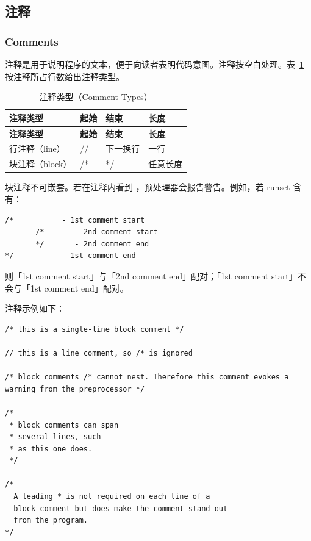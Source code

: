 \subsection{注释}
\subsubsection*{Comments}

注释是用于说明程序的文本，便于向读者表明代码意图。注释按空白处理。表~\ref{tab:pxl-comment-types} 按注释所占行数给出注释类型。

\begin{longtable}{@{}p{} >{\raggedright\arraybackslash\ttfamily}p{} >{\raggedright\arraybackslash\ttfamily}p{} p{}@{}}
\caption{注释类型（Comment Types）}\label{tab:pxl-comment-types}\\
\toprule
\textbf{\textrm{注释类型}} & \textbf{\textrm{起始}} & \textbf{\textrm{结束}} & \textbf{\textrm{长度}} \\
\midrule
\endfirsthead
\toprule
\textbf{\textrm{注释类型}} & \textbf{\textrm{起始}} & \textbf{\textrm{结束}} & \textbf{\textrm{长度}} \\
\midrule
\endhead
\bottomrule
\endfoot
\textrm{行注释（line）} & // & 下一换行 & 一行 \\
\textrm{块注释（block）} & /* & */ & 任意长度 \\
\end{longtable}

块注释不可嵌套。若在注释内看到 \cmd{*/}，预处理器会报告警告。例如，若 runset 含有：
\begin{lstlisting}[style=pxl]
/*           - 1st comment start
       /*       - 2nd comment start
       */       - 2nd comment end
*/           - 1st comment end
\end{lstlisting}

则「1st comment start」与「2nd comment end」配对；「1st comment start」不会与「1st comment end」配对。

注释示例如下：
\begin{lstlisting}[style=pxl]
/* this is a single-line block comment */

// this is a line comment, so /* is ignored

/* block comments /* cannot nest. Therefore this comment evokes a
warning from the preprocessor */

/*
 * block comments can span
 * several lines, such
 * as this one does.
 */

/*
  A leading * is not required on each line of a
  block comment but does make the comment stand out
  from the program.
*/
\end{lstlisting}

